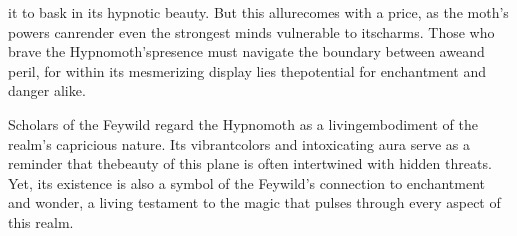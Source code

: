 \vspace*{3\fontdimen6\font}
\noindent \hspace*{4.85em}it to bask in its hypnotic beauty. But this allure\linebreak\hspace*{4.5em}comes with a price, as the moth's powers can\linebreak\hspace*{4.15em}render even the strongest minds vulnerable to its\linebreak\hspace*{3.8em}charms. Those who brave the Hypnomoth's\linebreak\hspace*{3.45em}presence must navigate the boundary between awe\linebreak\hspace*{3em}and peril, for within its mesmerizing display lies the\linebreak\hspace*{2.5em}potential for enchantment and danger alike.

\hspace*{1em}Scholars of the Feywild regard the Hypnomoth as a living\linebreak\hspace*{1.35em}embodiment of the realm's capricious nature. Its vibrant\linebreak\hspace*{0.9em}colors and intoxicating aura serve as a reminder that the\linebreak\hspace*{0.2em}beauty of this plane is often intertwined with hidden threats. Yet, its existence is also a symbol of the Feywild's connection to enchantment and wonder, a living testament to the magic that pulses through every aspect of this realm.

\clearpage

